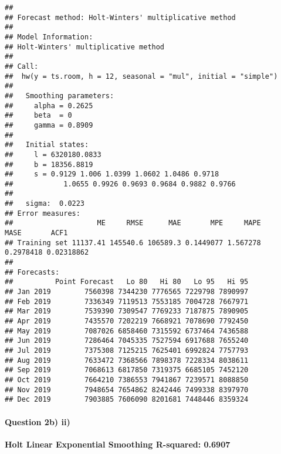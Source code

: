 \documentclass[]{article}
\newenvironment{Shaded}{\begin{snugshade}}{\end{snugshade}}
\newcommand{\DecValTok}[1]{\textcolor[rgb]{0.00,0.00,0.81}{#1}}
\newcommand{\KeywordTok}[1]{\textcolor[rgb]{0.13,0.29,0.53}{\textbf{#1}}}
\newcommand{\NormalTok}[1]{#1}
\newcommand{\OperatorTok}[1]{\textcolor[rgb]{0.81,0.36,0.00}{\textbf{#1}}}
\newcommand{\StringTok}[1]{\textcolor[rgb]{0.31,0.60,0.02}{#1}}
\let\oldparagraph\paragraph
\renewcommand{\paragraph}[1]{\oldparagraph{#1}\mbox{}}
\begin{document}
\begin{verbatim}
## 
## Forecast method: Holt-Winters' multiplicative method
## 
## Model Information:
## Holt-Winters' multiplicative method 
## 
## Call:
##  hw(y = ts.room, h = 12, seasonal = "mul", initial = "simple") 
## 
##   Smoothing parameters:
##     alpha = 0.2625 
##     beta  = 0 
##     gamma = 0.8909 
## 
##   Initial states:
##     l = 6320180.0833 
##     b = 18356.8819 
##     s = 0.9129 1.006 1.0399 1.0602 1.0486 0.9718
##            1.0655 0.9926 0.9693 0.9684 0.9882 0.9766
## 
##   sigma:  0.0223
## Error measures:
##                    ME     RMSE      MAE       MPE     MAPE      MASE       ACF1
## Training set 11137.41 145540.6 106589.3 0.1449077 1.567278 0.2978418 0.02318862
## 
## Forecasts:
##          Point Forecast   Lo 80   Hi 80   Lo 95   Hi 95
## Jan 2019        7560398 7344230 7776565 7229798 7890997
## Feb 2019        7336349 7119513 7553185 7004728 7667971
## Mar 2019        7539390 7309547 7769233 7187875 7890905
## Apr 2019        7435570 7202219 7668921 7078690 7792450
## May 2019        7087026 6858460 7315592 6737464 7436588
## Jun 2019        7286464 7045335 7527594 6917688 7655240
## Jul 2019        7375308 7125215 7625401 6992824 7757793
## Aug 2019        7633472 7368566 7898378 7228334 8038611
## Sep 2019        7068613 6817850 7319375 6685105 7452120
## Oct 2019        7664210 7386553 7941867 7239571 8088850
## Nov 2019        7948654 7654862 8242446 7499338 8397970
## Dec 2019        7903885 7606090 8201681 7448446 8359324
\end{verbatim}

\begin{Shaded}
\end{Shaded}

\hypertarget{question-2b-ii}{%
\paragraph{Question 2b) ii)}\label{question-2b-ii}}

\textbf{Holt Linear Exponential Smoothing R-squared: 0.6907}
\end{document}
